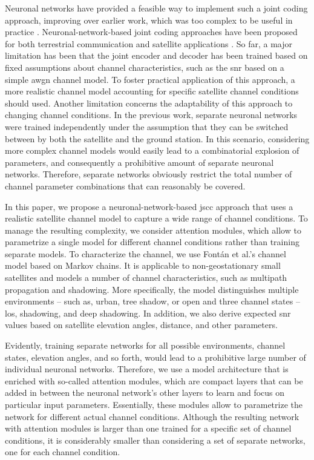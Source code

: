 \documentclass[conference]{IEEEtran}
\begin{document}
Neuronal networks have provided a feasible way to implement such a joint coding approach, improving over earlier work, which was too complex to be useful in practice \cite{9838671}.
Neuronal-network-based joint coding approaches have been proposed for both terrestrial communication \cite{Bourtsoulatze2019} and satellite applications \cite{satjscc}.
So far, a major limitation has been that the joint encoder and decoder has been trained based on fixed assumptions about channel characteristics, such as the \ac{snr} based on a simple \ac{awgn} channel model. 
To foster practical application of this approach, 
a more realistic channel model accounting for specific satellite channel conditions should used.
Another limitation concerns the adaptability of this approach to changing channel conditions. In the previous work, separate neuronal networks were trained independently under the assumption that they can be switched between by both the satellite and the ground station.
In this scenario, considering more complex channel models would easily lead to a combinatorial explosion of parameters, and consequently a prohibitive amount of separate neuronal networks.
Therefore, separate networks obviously restrict the total number of channel parameter combinations that can reasonably be covered.

In this paper, we propose a neuronal-network-based \ac{jscc} approach that uses a realistic satellite channel model to capture a wide range of channel conditions.
To manage the resulting complexity, we consider attention modules, which allow to parametrize a single model for different channel conditions rather than training separate models.
To characterize the channel, we use Fontán et al.'s channel model \cite{fontan2001} based on Markov chains.
It is applicable to non-geostationary small satellites and models a number of channel characteristics, such as multipath propagation and shadowing.
More specifically, the model distinguishes multiple environments -- such as, urban, tree shadow, or open and three channel states -- \ac{los}, shadowing, and deep shadowing.
In addition, we also derive expected \ac{snr} values based on satellite elevation angles, distance, and other parameters.

Evidently, training separate networks for all possible environments, channel states, elevation angles, and so forth, would lead to a prohibitive large number of individual neuronal networks.
Therefore, we use a model architecture that is enriched with so-called attention modules, which are compact layers that can be added in between the neuronal network's other layers to learn and focus on particular input parameters.
Essentially, these modules allow to parametrize the network for different actual channel conditions.
Although the resulting network with attention modules is larger than one trained for a specific set of channel conditions, it is considerably smaller than considering a set of separate networks, one for each channel condition.
\end{document}
